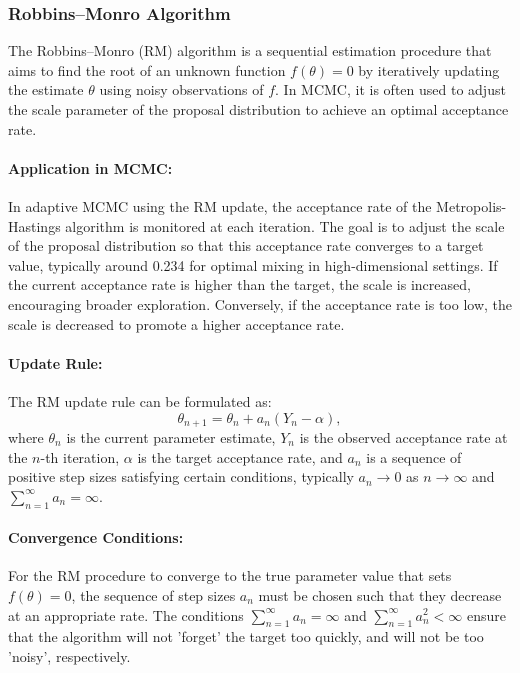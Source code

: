 \documentclass{article}
\begin{document}
\subsubsection{Robbins–Monro Algorithm}
The Robbins–Monro (RM) algorithm is a sequential estimation procedure that aims to find the root of an unknown function \( f(\theta) = 0 \) by iteratively updating the estimate \( \theta \) using noisy observations of \( f \). In MCMC, it is often used to adjust the scale parameter of the proposal distribution to achieve an optimal acceptance rate.

\paragraph{Application in MCMC:}
In adaptive MCMC using the RM update, the acceptance rate of the Metropolis-Hastings algorithm is monitored at each iteration. The goal is to adjust the scale of the proposal distribution so that this acceptance rate converges to a target value, typically around 0.234 for optimal mixing in high-dimensional settings. If the current acceptance rate is higher than the target, the scale is increased, encouraging broader exploration. Conversely, if the acceptance rate is too low, the scale is decreased to promote a higher acceptance rate.

\paragraph{Update Rule:}
The RM update rule can be formulated as:
\[
\theta_{n+1} = \theta_n + a_n(Y_n - \alpha),
\]
where \( \theta_n \) is the current parameter estimate, \( Y_n \) is the observed acceptance rate at the \( n \)-th iteration, \( \alpha \) is the target acceptance rate, and \( a_n \) is a sequence of positive step sizes satisfying certain conditions, typically \( a_n \to 0 \) as \( n \to \infty \) and \( \sum_{n=1}^{\infty} a_n = \infty \).

\paragraph{Convergence Conditions:}
For the RM procedure to converge to the true parameter value that sets \( f(\theta) = 0 \), the sequence of step sizes \( a_n \) must be chosen such that they decrease at an appropriate rate. The conditions \( \sum_{n=1}^{\infty} a_n = \infty \) and \( \sum_{n=1}^{\infty} a_n^2 < \infty \) ensure that the algorithm will not 'forget' the target too quickly, and will not be too 'noisy', respectively.
\end{document}
